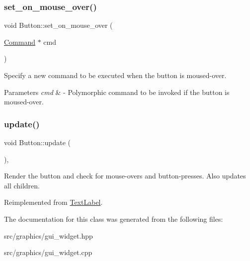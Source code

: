 \subsubsection{\texorpdfstring{set\+\_\+on\+\_\+mouse\+\_\+over()}{set\_on\_mouse\_over()}}
{\footnotesize\ttfamily void Button\+::set\+\_\+on\+\_\+mouse\+\_\+over (\begin{DoxyParamCaption}\item[{\mbox{\hyperlink{class_command}{Command}} $\ast$}]{cmd }\end{DoxyParamCaption})}

Specify a new command to be executed when the button is moused-\/over. 
\begin{DoxyParams}{Parameters}
{\em cmd} & -\/ Polymorphic command to be invoked if the button is moused-\/over. \\
\hline
\end{DoxyParams}
\mbox{\label{class_button_abda97f1ae8e081da3dbd0b77a27cad9d}} 
\subsubsection{\texorpdfstring{update()}{update()}}
{\footnotesize\ttfamily void Button\+::update (\begin{DoxyParamCaption}{ }\end{DoxyParamCaption})\hspace{0.3cm}{\ttfamily [override]}, {\ttfamily [virtual]}}

Render the button and check for mouse-\/overs and button-\/presses. Also updates all children. 

Reimplemented from \mbox{\hyperlink{class_text_label_a350a9edc23e4d2a53374fddc5ddc61cc}{Text\+Label}}.



The documentation for this class was generated from the following files\+:\begin{DoxyCompactItemize}
\item 
src/graphics/gui\+\_\+widget.\+hpp\item 
src/graphics/gui\+\_\+widget.\+cpp\end{DoxyCompactItemize}
